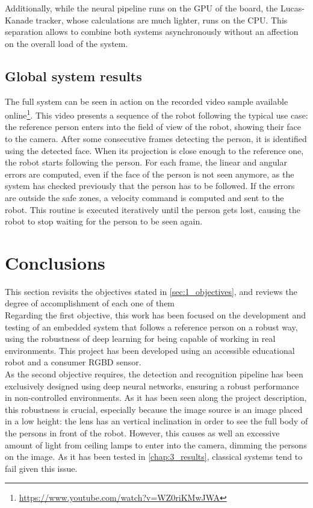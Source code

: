 Additionally, while the neural pipeline runs on the GPU of the board, the Lucas-Kanade tracker, whose calculations are much lighter, runs on the CPU. This separation allows to combine both systems asynchronously without an affection on the overall load of the system.



\subsection{Global system results}

The full system can be seen in action on the recorded video sample available online\footnote{\url{https://www.youtube.com/watch?v=WZ0riKMwJWA}}. This video presents a sequence of the robot following the typical use case: the reference person enters into the field of view of the robot, showing their face to the camera. After some consecutive frames detecting the person, it is identified using the detected face. When its projection is close enough to the reference one, the robot starts following the person. For each frame, the linear and angular errors are computed, even if the face of the person is not seen anymore, as the system has checked previously that the person has to be followed. If the errors are outside the safe zones, a velocity command is computed and sent to the robot. This routine is executed iteratively until the person gets lost, causing the robot to stop waiting for the person to be seen again.


\newpage
\section{Conclusions}

This section revisits the objectives stated in \autoref{sec:1_objectives}, and reviews the degree of accomplishment of each one of them\\

Regarding the first objective, this work has been focused on the development and testing of an embedded system that follows a reference person on a robust way, using the robustness of deep learning for being capable of working in real environments. This project has been developed using an accessible educational robot and a consumer RGBD sensor.\\

As the second objective requires, the detection and recognition pipeline has been exclusively designed using deep neural networks, ensuring a robust performance in non-controlled environments. As it has been seen along the project description, this robustness is crucial, especially because the image source is an image placed in a low height: the lens has an vertical inclination in order to see the full body of the persons in front of the robot. However, this causes as well an excessive amount of light from ceiling lamps to enter into the camera, dimming the persons on the image. As it has been tested in \autoref{chap:3_results}, classical systems tend to fail given this issue.\\


